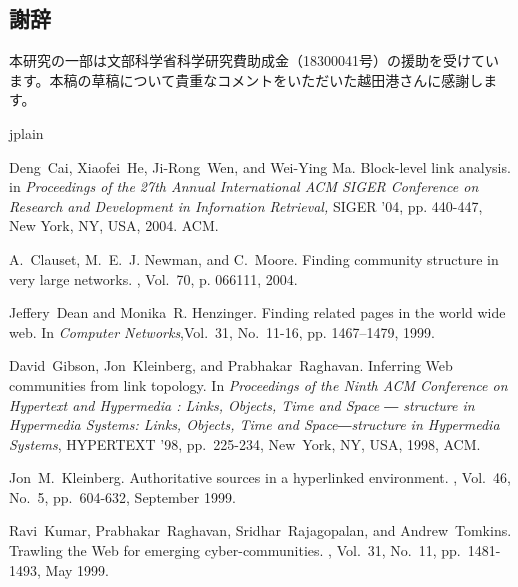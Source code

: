 \documentclass [a4j,11pt] {jsarticle}
\begin{document}
\subsection*{謝辞}

本研究の一部は文部科学省科学研究費助成金（18300041号）の援助を受けてい
ます。本稿の草稿について貴重なコメントをいただいた越田港さんに感謝しま
す。


 {jplain} %

\begin{thebibliography}{10}

Deng~Cai, Xiaofei~He, Ji-Rong~Wen, and Wei-Ying Ma.
\newblock Block-level link analysis.
\newblock in {\em Proceedings of the 27th Annual International ACM SIGER Conference on Research and Development in Infornation Retrieval,}
\newblock SIGER '04, pp. 440-447, New York, NY, USA, 2004. ACM.

A.~Clauset, M.~E.~J. Newman, and C.~Moore.
\newblock Finding community structure in very large networks.
, Vol.~70, p. 066111, 2004.

Jeffery~Dean and Monika~R. Henzinger.
\newblock Finding related pages in the world wide web.
\newblock In {\em Computer Networks},Vol.~31, No.~11-16, pp. 1467--1479, 1999.

David~Gibson, Jon~Kleinberg, and Prabhakar~Raghavan.
\newblock Inferring Web communities from link topology.
\newblock In {\em Proceedings of the Ninth ACM Conference on Hypertext and Hypermedia : Links, Objects, Time and Space ― structure in Hypermedia Systems: Links, Objects, Time and Space―structure in Hypermedia Systems},
\newblock HYPERTEXT '98, pp.~225-234, New~York, NY, USA, 1998, ACM.

Jon~M.~Kleinberg.
\newblock Authoritative sources in a hyperlinked environment.
, Vol.~46, No.~5, pp.~604-632, September 1999.

Ravi~Kumar, Prabhakar~Raghavan, Sridhar~Rajagopalan, and Andrew~Tomkins.
\newblock Trawling the Web for emerging cyber-communities.
, Vol.~31, No.~11, pp.~1481-1493, May 1999.


\end{thebibliography}
\end{document}
